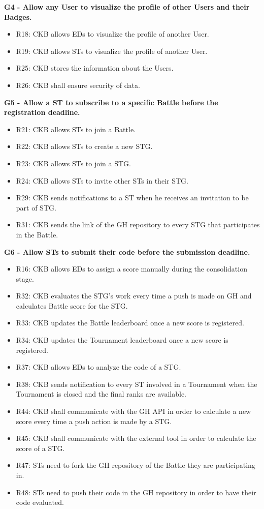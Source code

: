 \vspace{1.5cm}
\textbf{G4 - Allow any User to visualize the profile of other Users and their Badges.}
\begin{itemize}
    \item R18: CKB allows EDs to visualize the profile of another User.
    \item R19: CKB allows STs to visualize the profile of another User.
    \item R25: CKB stores the information about the Users.
    \item R26: CKB shall ensure security of data. 
\end{itemize}


\vspace{1.5cm}
\textbf{G5 - Allow a ST to subscribe to a specific Battle before the registration deadline.}
\begin{itemize}
    \item R21: CKB allows STs to join a Battle.
    \item R22: CKB allows STs to create a new STG.
    \item R23: CKB allows STs to join a STG.
    \item R24: CKB allows STs to invite other STs in their STG.
    \item R29: CKB sends notifications to a ST when he receives an invitation to be part of STG.
    \item R31: CKB sends the link of the GH repository to every STG that participates in the Battle.
\end{itemize}


\vspace{1.5cm}
\textbf{G6 - Allow STs to submit their code before the submission deadline.}
\begin{itemize}
    \item R16: CKB allows EDs to assign a score manually during the consolidation stage.
    \item R32: CKB evaluates the STG's work every time a push is made on GH and calculates Battle score for the STG.
    \item R33: CKB updates the Battle leaderboard once a new score is registered.
    \item R34: CKB updates the Tournament leaderboard once a new score is registered.
    \item R37: CKB allows EDs to analyze the code of a STG.
    \item R38: CKB sends notification to every ST involved in a Tournament when the Tournament is closed and the final ranks are available.
    \item R44: CKB shall communicate with the GH API in order to calculate a new score every time a push action is made by a STG.
    \item R45: CKB shall communicate with the external tool in order to calculate the score of a STG.
    \item R47: STs need to fork the GH repository of the Battle they are participating in.
    \item R48: STs need to push their code in the GH repository in order to have their code evaluated.
\end{itemize}


